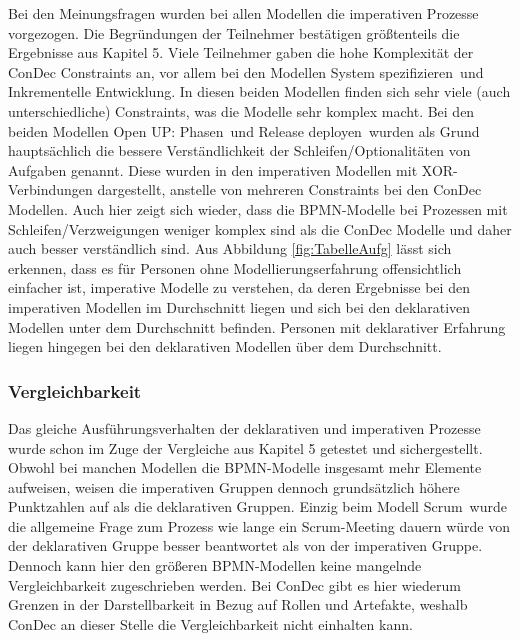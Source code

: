 Bei den Meinungsfragen wurden bei allen Modellen die imperativen Prozesse vorgezogen. Die Begründungen der Teilnehmer bestätigen größtenteils die Ergebnisse aus Kapitel 5. Viele Teilnehmer gaben die hohe Komplexität der ConDec Constraints an, vor allem bei den Modellen \grqq System spezifizieren\grqq \ und \grqq Inkrementelle Entwicklung\grqq. In diesen beiden Modellen finden sich sehr viele (auch unterschiedliche) Constraints, was die Modelle sehr komplex macht.\newline
Bei den beiden Modellen \grqq Open UP: Phasen\grqq \ und \grqq Release deployen\grqq \ wurden als Grund hauptsächlich die bessere Verständlichkeit der Schleifen/Optionalitäten von Aufgaben genannt. Diese wurden in den imperativen Modellen mit XOR-Verbindungen dargestellt, anstelle von mehreren Constraints bei den ConDec Modellen. Auch hier zeigt sich wieder, dass die BPMN-Modelle bei Prozessen mit Schleifen/Verzweigungen weniger komplex sind als die ConDec Modelle und daher auch besser verständlich sind.\newline
Aus Abbildung \ref{fig:TabelleAufg} lässt sich erkennen, dass es für Personen ohne Modellierungserfahrung offensichtlich einfacher ist, imperative Modelle zu verstehen, da deren Ergebnisse bei den imperativen Modellen im Durchschnitt liegen und sich bei den deklarativen Modellen unter dem Durchschnitt befinden. Personen mit deklarativer Erfahrung liegen hingegen bei den deklarativen Modellen über dem Durchschnitt.\newline



\subsubsection{Vergleichbarkeit}
Das gleiche Ausführungsverhalten der deklarativen und imperativen Prozesse wurde schon im Zuge der Vergleiche aus Kapitel 5 getestet und sichergestellt. \newline
Obwohl bei manchen Modellen die BPMN-Modelle insgesamt mehr Elemente aufweisen, weisen die imperativen Gruppen dennoch grundsätzlich höhere Punktzahlen auf als die deklarativen Gruppen. Einzig beim Modell \grqq Scrum\grqq \ wurde die allgemeine Frage zum Prozess wie lange ein Scrum-Meeting dauern würde von der deklarativen Gruppe besser beantwortet als von der imperativen Gruppe. Dennoch kann hier den größeren BPMN-Modellen keine mangelnde Vergleichbarkeit zugeschrieben werden.\newline
Bei ConDec gibt es hier wiederum Grenzen in der Darstellbarkeit in Bezug auf Rollen und Artefakte, weshalb ConDec an dieser Stelle die Vergleichbarkeit nicht einhalten kann.\newline


